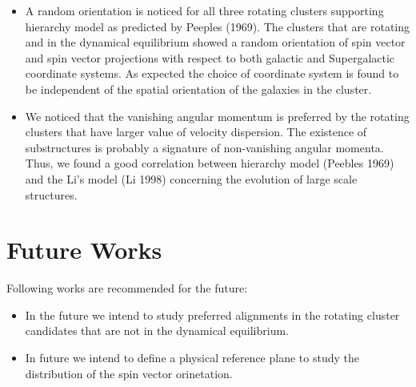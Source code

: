 \begin{itemize}
\item A random orientation is noticed for all three rotating clusters
supporting hierarchy model as predicted by Peeples (1969). The
clusters that are rotating and in the dynamical equilibrium showed
a random orientation of spin vector and spin vector projections
with respect to both galactic and Supergalactic coordinate
systems. As expected the choice of coordinate system is found to
be independent of the spatial orientation of the galaxies in the
cluster.

\item We noticed that the vanishing angular momentum is
preferred by the rotating clusters that have larger value of
velocity dispersion. The existence of substructures is probably a
signature of non-vanishing angular momenta. Thus, we found a good
correlation between hierarchy model (Peebles 1969) and the Li's
model (Li 1998) concerning the evolution of large scale
structures. 


\end{itemize}
\section{Future Works}

Following works are recommended for the future:
\begin{itemize}
 \item In the future we intend to study preferred alignments in the rotating
cluster candidates that are not in the dynamical equilibrium.
\item In future we intend to define a physical reference plane to study the distribution of the spin vector orinetation.

\end{itemize}